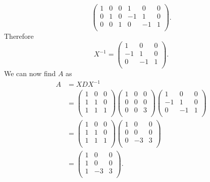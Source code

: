 \[ 
\left( \begin{array}{ccc|ccc}
1 & 0 & 0 & 1 & 0 & 0\\
0 & 1 & 0 & -1 & 1 & 0\\
0 & 0 & 1 & 0 & -1 & 1\\
\end{array} \right)
.\]
Therefore
\[ 
X^{-1} = \begin{pmatrix}
1 & 0 & 0\\
-1 & 1 & 0\\
0 & -1 & 1\\
\end{pmatrix}
.\]
We can now find $A$ as
\begin{align*}
  A &= X D X^{-1}  \\
    &= \begin{pmatrix}
1 & 0 & 0\\
1 & 1 & 0\\
1 & 1 & 1\\
\end{pmatrix} \begin{pmatrix}
1 & 0 & 0\\
0 & 0 & 0\\
0 & 0 & 3\\
\end{pmatrix} \begin{pmatrix}
1 & 0 & 0\\
-1 & 1 & 0\\
0 & -1 & 1\\
\end{pmatrix} \\
&= \begin{pmatrix}
1 & 0 & 0\\
1 & 1 & 0\\
1 & 1 & 1\\
\end{pmatrix} \begin{pmatrix}
1 & 0 & 0\\
0 & 0 & 0\\
0 & -3 & 3\\
\end{pmatrix} \\
&= \begin{pmatrix}
1 & 0 & 0\\
1 & 0 & 0\\
1 & -3 & 3\\
\end{pmatrix}
.\end{align*}

